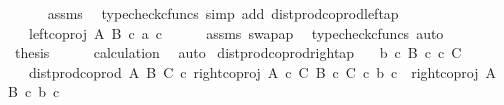 \begin{isabellebody}
\ \ \ \ \isamarkupfalse%
\ assms\ \isamarkupfalse%
\ {\isacharparenleft}{\kern0pt}typecheck{\isacharunderscore}{\kern0pt}cfuncs{\isacharcomma}{\kern0pt}\ simp\ add{\isacharcolon}{\kern0pt}\ dist{\isacharunderscore}{\kern0pt}prod{\isacharunderscore}{\kern0pt}coprod{\isacharunderscore}{\kern0pt}left{\isacharunderscore}{\kern0pt}ap{\isacharparenright}{\kern0pt}\isanewline
\ \ \isamarkupfalse%
\ \isamarkupfalse%
\ {\isachardoublequoteopen}{\isachardot}{\kern0pt}{\isachardot}{\kern0pt}{\isachardot}{\kern0pt}\ {\isacharequal}{\kern0pt}\ {\isasymlangle}left{\isacharunderscore}{\kern0pt}coproj\ A\ B\ {\isasymcirc}\isactrlsub c\ a{\isacharcomma}{\kern0pt}\ c{\isasymrangle}{\isachardoublequoteclose}\isanewline
\ \ \ \ \isamarkupfalse%
\ assms\ swap{\isacharunderscore}{\kern0pt}ap\ \isamarkupfalse%
\ {\isacharparenleft}{\kern0pt}typecheck{\isacharunderscore}{\kern0pt}cfuncs{\isacharcomma}{\kern0pt}\ auto{\isacharparenright}{\kern0pt}\isanewline
\ \ \isamarkupfalse%
\ \isamarkupfalse%
\ {\isacharquery}{\kern0pt}thesis\isanewline
\ \ \ \ \isamarkupfalse%
\ calculation\ \isamarkupfalse%
\ auto\isanewline
{}\isamarkupfalse%
%
\endisatagproof
{\isafoldproof}%
%
\isadelimproof
\isanewline
%
\endisadelimproof
\isanewline
{}\isamarkupfalse%
\ dist{\isacharunderscore}{\kern0pt}prod{\isacharunderscore}{\kern0pt}coprod{}{\isacharunderscore}{\kern0pt}right{\isacharunderscore}{\kern0pt}ap{\isacharcolon}{\kern0pt}\isanewline
\ \ \ {\isachardoublequoteopen}b\ {\isasymin}\isactrlsub c\ B{\isachardoublequoteclose}\ {\isachardoublequoteopen}c\ {\isasymin}\isactrlsub c\ C{\isachardoublequoteclose}\isanewline
\ \ \ {\isachardoublequoteopen}dist{\isacharunderscore}{\kern0pt}prod{\isacharunderscore}{\kern0pt}coprod{}\ A\ B\ C\ {\isasymcirc}\isactrlsub c\ right{\isacharunderscore}{\kern0pt}coproj\ {\isacharparenleft}{\kern0pt}A\ {\isasymtimes}\isactrlsub c\ C{\isacharparenright}{\kern0pt}\ {\isacharparenleft}{\kern0pt}B\ {\isasymtimes}\isactrlsub c\ C{\isacharparenright}{\kern0pt}\ {\isasymcirc}\isactrlsub c\ {\isasymlangle}b{\isacharcomma}{\kern0pt}\ c{\isasymrangle}\ {\isacharequal}{\kern0pt}\ {\isasymlangle}right{\isacharunderscore}{\kern0pt}coproj\ A\ B\ {\isasymcirc}\isactrlsub c\ b{\isacharcomma}{\kern0pt}\ c{\isasymrangle}{\isachardoublequoteclose}\isanewline
%
\isadelimproof
%
\endisadelimproof
%
\isatagproof
{}\isamarkupfalse%

\end{isabellebody}
